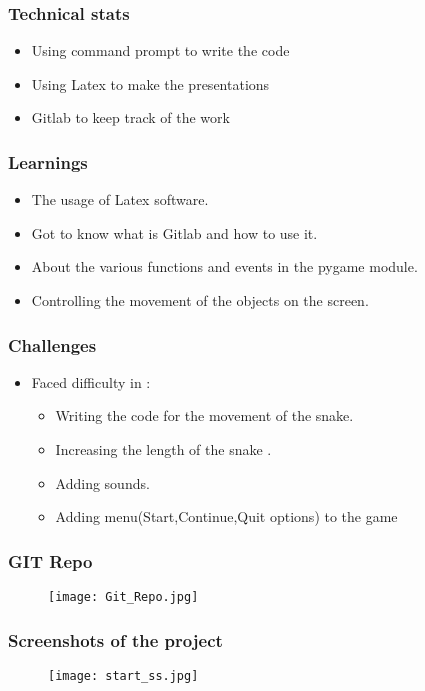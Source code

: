 \documentclass[14pt]{beamer}
\begin{document}
	\begin{frame}
	\frametitle{Technical stats}
	\begin{itemize}
	\item Using command prompt to write the code
	\item Using Latex to make the presentations
	\item Gitlab to keep track of the work
	\end{itemize}
	\end{frame}
 

    \begin{frame}
        \frametitle{Learnings}
	\begin{itemize}
	    \item  The usage of Latex software.
	    \item Got to know what is Gitlab and how to use it.
              \item About the various functions and events in the pygame module.
		\item Controlling the movement of the objects on the screen.
	\end{itemize}
    \end{frame}
    \begin{frame}
	\frametitle{Challenges}
        \begin{itemize}
	    \item Faced difficulty in :
	   \begin{itemize}
		\item  Writing the code for the movement of the snake.
	          \item  Increasing the length of the snake .
		\item Adding sounds.
		\item Adding menu(Start,Continue,Quit options) to the game 
\end{itemize}    
\end{itemize}
    \end{frame}
\begin{frame}
	\frametitle{GIT Repo}
          \begin{figure}
	  \texttt{[image: Git\_Repo.jpg]}
           \end{figure} 
    \end{frame}
\begin{frame}
	\frametitle{Screenshots of the project}
          \begin{figure}
	  \texttt{[image: start\_ss.jpg]}
           \end{figure} 
    \end{frame}
\end{document}
